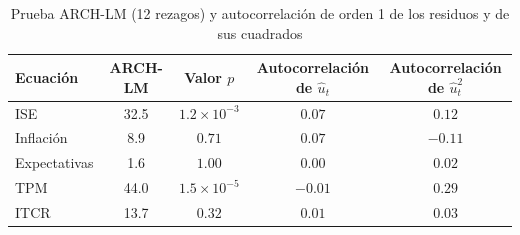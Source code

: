 \begin{table}[H]
\centering
\caption{Prueba ARCH-LM (12 rezagos) y autocorrelación de orden 1 de los residuos y de sus cuadrados}
\label{tab:D_arch}
\small
\begin{tabular}{@{}lcccc@{}}
\toprule
Ecuación & ARCH-LM & Valor $p$ & Autocorrelación de $\hat u_t$ & Autocorrelación de $\hat u_t^2$ \\
\midrule
ISE & 32.5 & $1.2\times10^{-3}$ & $0.07$ & $0.12$ \\
Inflación & 8.9 & $0.71$ & $0.07$ & $-0.11$ \\
Expectativas & 1.6 & $1.00$ & $0.00$ & $0.02$ \\
TPM & 44.0 & $1.5\times10^{-5}$ & $-0.01$ & $0.29$ \\
ITCR & 13.7 & $0.32$ & $0.01$ & $0.03$ \\
\bottomrule
\end{tabular}
\end{table}
